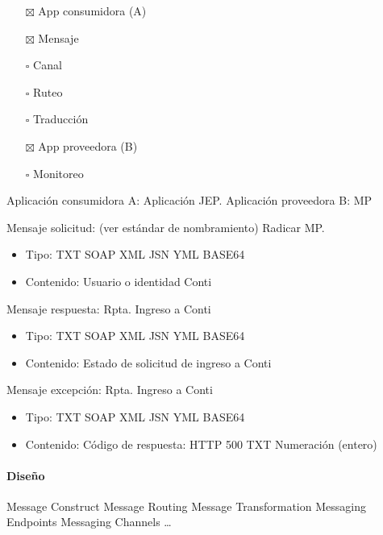 \documentclass[
  paper=a4,
  ,captions=tableheading
]{scrartcl}
\providecommand{\tightlist}{%
  \setlength{\itemsep}{0pt}\setlength{\parskip}{0pt}}
\begin{document}
\begin{itemize}
\tightlist
\item[$\boxtimes$]
  App consumidora (A)
\item[$\boxtimes$]
  Mensaje
\item[$\square$]
  Canal
\item[$\square$]
  Ruteo
\item[$\square$]
  Traducción
\item[$\boxtimes$]
  App proveedora (B)
\item[$\square$]
  Monitoreo
\end{itemize}

Aplicación consumidora A: Aplicación JEP. Aplicación proveedora B: MP

Mensaje solicitud: (ver estándar de nombramiento) Radicar MP.

\begin{itemize}
\tightlist
\item
  Tipo: TXT \textbar{} SOAP \textbar{} XML \textbar{} JSN \textbar{} YML
  \textbar{} BASE64
\item
  Contenido: Usuario o identidad Conti
\end{itemize}

Mensaje respuesta: Rpta. Ingreso a Conti

\begin{itemize}
\tightlist
\item
  Tipo: TXT \textbar{} SOAP \textbar{} XML \textbar{} JSN \textbar{} YML
  \textbar{} BASE64
\item
  Contenido: Estado de solicitud de ingreso a Conti
\end{itemize}

Mensaje excepción: Rpta. Ingreso a Conti

\begin{itemize}
\tightlist
\item
  Tipo: TXT \textbar{} SOAP \textbar{} XML \textbar{} JSN \textbar{} YML
  \textbar{} BASE64
\item
  Contenido: Código de respuesta: HTTP 500 \textbar{} TXT \textbar{}
  Numeración (entero)
\end{itemize}

\paragraph{Diseño}\label{sec:diseuxf1o}

Message Construct \textbar{} Message Routing \textbar{} Message
Transformation \textbar{} Messaging Endpoints \textbar{} Messaging
Channels \textbar{} \ldots{}
\end{document}
